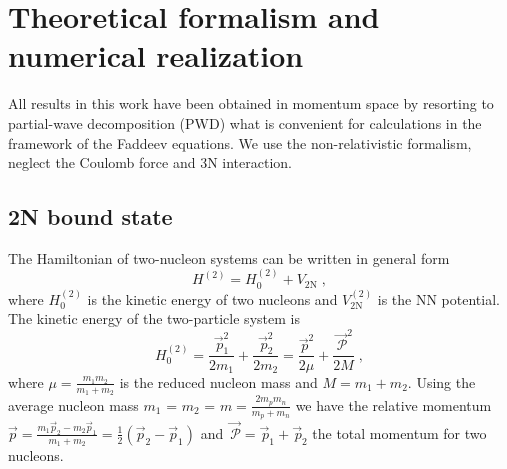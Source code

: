 \chapter{Theoretical formalism and numerical realization}
\label{formalism}
All results in this work have been obtained in momentum space by resorting to partial-wave decomposition (PWD) what is convenient for calculations in the framework of the Faddeev equations. We use the non-relativistic formalism, neglect the Coulomb force and 3N interaction.
\section{2N bound state}
\label{calculation}
The Hamiltonian of two-nucleon systems can be written in general form
\begin{equation}
H^{(2)} = H^{(2)}_{0} + V_{\mathrm{2N}}\;,
\end{equation}
where $H^{(2)}_{0}$ is the kinetic energy of two nucleons and $V^{(2)}_{\mathrm{2N}}$ is the NN potential. The kinetic energy of the two-particle system is
\begin{equation}
H^{(2)}_{0} = \frac{\vec{\!{\,p}}^{2}_{1}}{2m_{1}} + \frac{\vec{\!{\,p}}^{2}_{2}}{2m_{2}} = \frac{\vec{\!{\,p}}^{2}}{2\mu} + \frac{\vec{\!{\,\mathcal{P}}}^{2}}{2M}\;,
\label{eqHam1}
\end{equation}
where $\mu = \frac{m_{1}m_{2}}{m_{1}+m_{2}}$ is the reduced nucleon mass and $M = m_{1} + m_{2}$. Using the average nucleon mass $m_{1}$ = $m_{2}$ = $m = \frac{2m_{p}m_{n}}{m_{p} + m_{n}}$ we have the relative momentum $\vec{p}  = \frac{m_{1}\vec{p}_{2} - m_{2}\vec{p}_{1}}{m_{1} + m_{2}} = \frac{1}{2}\left(\vec{p}_{2} - \vec{p}_{1}\right)$ and $\!\vec{\,\mathcal{P}} = \!\!\vec{\,p}_{1} + \!\vec{\,p}_{2}$ the total momentum for two nucleons. 

